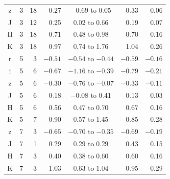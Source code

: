 \begin{tabular}{clrrcrr}
z & 3 & 18 & $-0.27$ & $-0.69$ to 0.05 & $-0.33$ & $-0.06$ \\
J & 3 & 12 & 0.25 & 0.02 to 0.66 & 0.19 & 0.07 \\
H & 3 & 18 & 0.71 & 0.48 to 0.98 & 0.70 & 0.16 \\
K & 3 & 18 & 0.97 & 0.74 to 1.76 & 1.04 & 0.26 \\
r & 5 & 3 & $-0.51$ & $-0.54$ to $-0.44$ & $-0.59$ & $-0.16$ \\
i & 5 & 6 & $-0.67$ & $-1.16$ to $-0.39$ & $-0.79$ & $-0.21$ \\
z & 5 & 6 & $-0.30$ & $-0.76$ to $-0.07$ & $-0.33$ & $-0.11$ \\
J & 5 & 6 & 0.18 & $-0.08$ to 0.41 & 0.13 & 0.03 \\
H & 5 & 6 & 0.56 & 0.47 to 0.70 & 0.67 & 0.16 \\
K & 5 & 7 & 0.90 & 0.57 to 1.45 & 0.85 & 0.28 \\
z & 7 & 3 & $-0.65$ & $-0.70$ to $-0.35$ & $-0.69$ & $-0.19$ \\
J & 7 & 1 & 0.29 & 0.29 to 0.29 & 0.43 & 0.15 \\
H & 7 & 3 & 0.40 & 0.38 to 0.60 & 0.60 & 0.16 \\
K & 7 & 3 & 1.03 & 0.63 to 1.04 & 0.95 & 0.29 \\
\bottomrule
\end{tabular}

